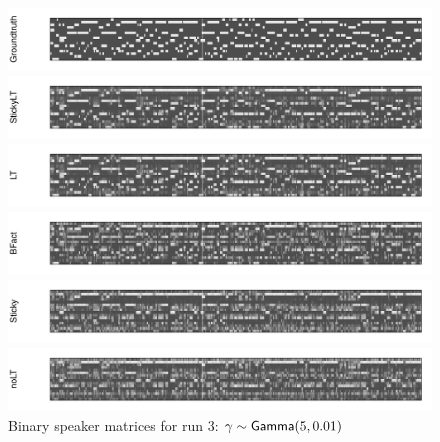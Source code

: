 \begin{figure}[tb]
\begin{center}
  \centerline{\includegraphics[width = \textwidth, height = 0.2\textwidth]{fig/cocktail/synth_s16_m12/hyper_gamma/h10.0_nocs_cp0/a5b0p01/groundtruth.pdf}}
  \centerline{\includegraphics[width = \textwidth, height = 0.2\textwidth]{fig/cocktail/synth_s16_m12/hyper_gamma/h10.0_nocs_cp0/a5b0p01/StickyLT_hdp_hmm_w0_agamma5_bgamma0p01/binary_state.pdf}}
  \centerline{\includegraphics[width = \textwidth, height = 0.2\textwidth]{fig/cocktail/synth_s16_m12/hyper_gamma/h10.0_nocs_cp0/a5b0p01/LT_hdp_hmm_w0_agamma5_bgamma0p01/binary_state.pdf}}
  \centerline{\includegraphics[width = \textwidth, height = 0.2\textwidth]{fig/cocktail/synth_s16_m12/hyper_gamma/h10.0_nocs_cp0/a5b0p01/BFact_hmm_w0_agamma5_bgamma0p01/binary_state.pdf}}
  \centerline{\includegraphics[width = \textwidth, height = 0.2\textwidth]{fig/cocktail/synth_s16_m12/hyper_gamma/h10.0_nocs_cp0/a5b0p01/Sticky_hdp_hmm_w0_agamma5_bgamma0p01/binary_state.pdf}}
  \centerline{\includegraphics[width = \textwidth, height = 0.2\textwidth]{fig/cocktail/synth_s16_m12/hyper_gamma/h10.0_nocs_cp0/a5b0p01/noLT_hdp_hmm_w0_agamma5_bgamma0p01/binary_state.pdf}}
\caption{Binary speaker matrices for run 3: $\gamma \sim \mathsf{Gamma}(5,0.01)$}
\end{center}
\end{figure}

